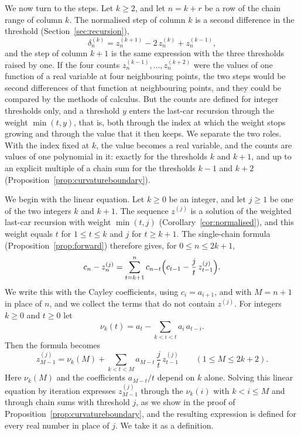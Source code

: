\documentclass{amsart}
\theoremstyle{definition}
\theoremstyle{remark}
\numberwithin{equation}{section}
\begin{document}
We now turn to the steps. Let $k\ge 2$, and let $n=k+r$ be a row of the chain range of column $k$. The normalised step of column $k$ is a second difference in the threshold (Section~\ref{sec:recursion}),
\[
\delta^{(k)}_n=z^{(k+1)}_n-2\,z^{(k)}_n+z^{(k-1)}_n,
\]
and the step of column $k+1$ is the same expression with the three thresholds raised by one. If the four counts $z^{(k-1)}_n,\dots,z^{(k+2)}_n$ were the values of one function of a real variable at four neighbouring points, the two steps would be second differences of that function at neighbouring points, and they could be compared by the methods of calculus. But the counts are defined for integer thresholds only, and a threshold $y$ enters the last-car recursion through the weight $\min(t,y)$, that is, both through the index at which the weight stops growing and through the value that it then keeps. We separate the two roles. With the index fixed at $k$, the value becomes a real variable, and the counts are values of one polynomial in it: exactly for the thresholds $k$ and $k+1$, and up to an explicit multiple of a chain sum for the thresholds $k-1$ and $k+2$ (Proposition~\ref{prop:curvatureboundary}).

We begin with the linear equation. Let $k\ge 0$ be an integer, and let $j\ge 1$ be one of the two integers $k$ and $k+1$. The sequence $z^{(j)}$ is a solution of the weighted last-car recursion with weight $\min(t,j)$ (Corollary~\ref{cor:normalised}), and this weight equals $t$ for $1\le t\le k$ and $j$ for $t\ge k+1$. The single-chain formula (Proposition~\ref{prop:forward}) therefore gives, for $0\le n\le 2k+1$,
\[
c_n-z^{(j)}_n=\sum_{t=k+1}^{n}c_{n-t}\Bigl(c_{t-1}-\frac{j}{t}\,z^{(j)}_{t-1}\Bigr).
\]
We write this with the Cayley coefficients, using $c_i=a_{i+1}$, and with $M=n+1$ in place of $n$, and we collect the terms that do not contain $z^{(j)}$. For integers $k\ge 0$ and $t\ge 0$ let
\begin{equation}\label{eq:chains-nu}
\nu_k(t)=a_t-\sum_{k<i<t}a_i\,a_{t-i}.
\end{equation}
Then the formula becomes
\begin{equation}\label{eq:chains-linear}
z^{(j)}_{M-1}=\nu_k(M)+\sum_{k<t<M}a_{M-t}\,\frac{j}{t}\,z^{(j)}_{t-1}\qquad(1\le M\le 2k+2).
\end{equation}
Here $\nu_k(M)$ and the coefficients $a_{M-t}/t$ depend on $k$ alone. Solving this linear equation by iteration expresses $z^{(j)}_{M-1}$ through the $\nu_k(i)$ with $k<i\le M$ and through chain sums with threshold $j$, as we show in the proof of Proposition~\ref{prop:curvatureboundary}, and the resulting expression is defined for every real number in place of $j$. We take it as a definition.
\end{document}
